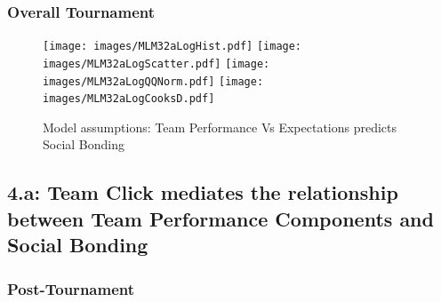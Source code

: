       \subsubsection{Overall Tournament\label{app8:MLM32a}}


       

       




      \begin{figure}[htbp]
        \texttt{[image: images/MLM32aLogHist.pdf]}
        \texttt{[image: images/MLM32aLogScatter.pdf]}
        \texttt{[image: images/MLM32aLogQQNorm.pdf]}
        \texttt{[image: images/MLM32aLogCooksD.pdf]}
        \caption{Model assumptions: Team Performance Vs Expectations predicts Social Bonding}
        \label{fig:MLM3bLogAssumptions}
      \end{figure}







        \subsection{4.a: Team Click mediates the relationship between Team Performance Components and Social Bonding}

      \subsubsection{Post-Tournament}


